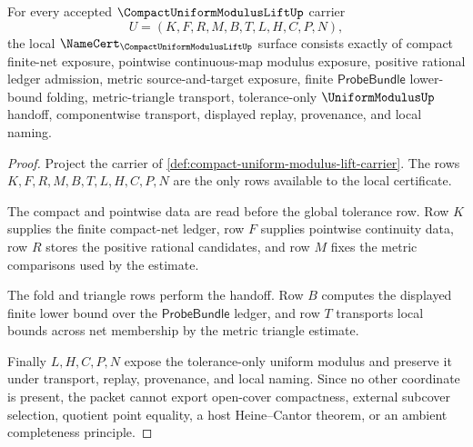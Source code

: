\begin{theorem}
\label{thm:compact-uniform-modulus-lift-namecert-obligations}
For every accepted $\CompactUniformModulusLiftUp$ carrier
$$
U=(K,F,R,M,B,T,L,H,C,P,N),
$$
the local $\NameCert_{\CompactUniformModulusLiftUp}$ surface consists exactly of compact finite-net exposure, pointwise continuous-map modulus exposure, positive rational ledger admission, metric source-and-target exposure, finite $\mathsf{ProbeBundle}$ lower-bound folding, metric-triangle transport, tolerance-only $\UniformModulusUp$ handoff, componentwise transport, displayed replay, provenance, and local naming.
\end{theorem}
\begin{proof}
Project the carrier of \autoref{def:compact-uniform-modulus-lift-carrier}. The rows $K,F,R,M,B,T,L,H,C,P,N$ are the only rows available to the local certificate.

The compact and pointwise data are read before the global tolerance row. Row $K$ supplies the finite compact-net ledger, row $F$ supplies pointwise continuity data, row $R$ stores the positive rational candidates, and row $M$ fixes the metric comparisons used by the estimate.

The fold and triangle rows perform the handoff. Row $B$ computes the displayed finite lower bound over the $\mathsf{ProbeBundle}$ ledger, and row $T$ transports local bounds across net membership by the metric triangle estimate.

Finally $L,H,C,P,N$ expose the tolerance-only uniform modulus and preserve it under transport, replay, provenance, and local naming. Since no other coordinate is present, the packet cannot export open-cover compactness, external subcover selection, quotient point equality, a host Heine--Cantor theorem, or an ambient completeness principle.
\end{proof}

